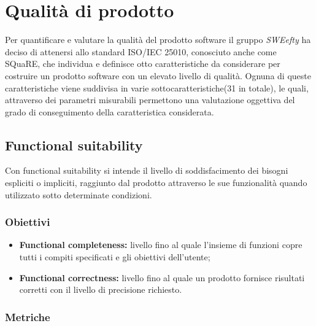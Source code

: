 \section{Qualità di prodotto}
\label{sec:qdpr}
Per quantificare e valutare la qualità del prodotto software il gruppo \textit{SWEefty} ha deciso di attenersi allo standard ISO/IEC 25010, conosciuto anche come SQuaRE, che individua e definisce otto caratteristiche da considerare per costruire un prodotto software con un elevato livello di qualità. Ognuna di queste caratteristiche viene suddivisa in varie sottocaratteristiche(31 in totale), le quali, attraverso dei parametri misurabili  permettono una valutazione oggettiva del grado di conseguimento della caratteristica considerata.
 
	\subsection{Functional suitability}
	Con functional suitability si intende il livello di soddisfacimento dei bisogni espliciti o impliciti, raggiunto dal prodotto attraverso le sue funzionalità quando utilizzato sotto determinate condizioni.
		\subsubsection{Obiettivi}
			\begin{itemize}
				\item {\textbf{Functional completeness:} livello fino al quale l'insieme di funzioni copre tutti i compiti specificati e gli obiettivi dell'utente;}
				\item {\textbf{Functional correctness:} livello fino al quale un prodotto fornisce risultati corretti con il livello di precisione richiesto.}
			\end{itemize}
		\subsubsection{Metriche}

